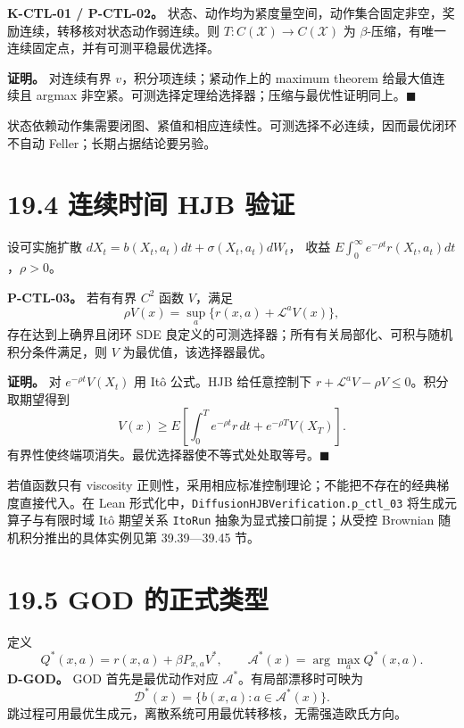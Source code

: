 \documentclass[
  11pt,
  oneside]{book}
\begin{document}
\hypertarget{p-ctl-02}{}\label{p-ctl-02}

\textbf{K-CTL-01 / P-CTL-02。} 状态、动作均为紧度量空间，动作集合固定非空，奖励连续，转移核对状态动作弱连续。则 \(T:C(\mathcal X)\to C(\mathcal X)\) 为 \(\beta\)-压缩，有唯一连续固定点，并有可测平稳最优选择。

\textbf{证明。} 对连续有界 \(v\)，积分项连续；紧动作上的 maximum theorem 给最大值连续且 argmax 非空紧。可测选择定理给选择器；压缩与最优性证明同上。\(\blacksquare\)

状态依赖动作集需要闭图、紧值和相应连续性。可测选择不必连续，因而最优闭环不自动 Feller；长期占据结论要另验。

\section{19.4 连续时间 HJB 验证}\label{ux8fdeux7eedux65f6ux95f4-hjb-ux9a8cux8bc1}

设可实施扩散 \(dX_t=b(X_t,a_t)dt+\sigma(X_t,a_t)dW_t\)， 收益 \(E\int_0^\infty e^{-\rho t}r(X_t,a_t)dt\)，\(\rho>0\)。

\hypertarget{p-ctl-03}{}\label{p-ctl-03}

\textbf{P-CTL-03。} 若有有界 \(C^2\) 函数 \(V\)，满足 \[\rho V(x)=\sup_a\{r(x,a)+\mathcal L^aV(x)\},\] 存在达到上确界且闭环 SDE 良定义的可测选择器；所有有关局部化、可积与随机积分条件满足，则 \(V\) 为最优值，该选择器最优。

\textbf{证明。} 对 \(e^{-\rho t}V(X_t)\) 用 Itô 公式。HJB 给任意控制下 \(r+\mathcal L^aV-\rho V\le0\)。积分取期望得到 \[V(x)\ge E\left[\int_0^T e^{-\rho t}r\,dt+e^{-\rho T}V(X_T)\right].\] 有界性使终端项消失。最优选择器使不等式处处取等号。\(\blacksquare\)

若值函数只有 viscosity 正则性，采用相应标准控制理论；不能把不存在的经典梯度直接代入。在 Lean 形式化中，\nolinkurl{DiffusionHJBVerification.p_ctl_03} 将生成元算子与有限时域 Itô 期望关系 \texttt{ItoRun} 抽象为显式接口前提；从受控 Brownian 随机积分推出的具体实例见第 39.39---39.45 节。

\section{19.5 GOD 的正式类型}\label{god-ux7684ux6b63ux5f0fux7c7bux578b}

定义 \[Q^*(x,a)=r(x,a)+\beta P_{x,a}V^*,\qquad
\mathcal A^*(x)=\arg\max_aQ^*(x,a).\] \textbf{D-GOD。} GOD 首先是最优动作对应 \(\mathcal A^*\)。有局部漂移时可映为 \[\mathcal D^*(x)=\{b(x,a):a\in\mathcal A^*(x)\}.\] 跳过程可用最优生成元，离散系统可用最优转移核，无需强造欧氏方向。
\end{document}
